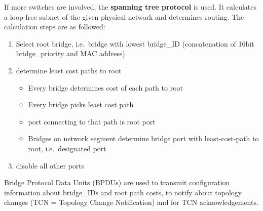 \vspace{10pt}
If more switches are involved, the \textbf{spanning tree protocol} is used.
It calculates a loop-free subnet of the given physical network and determines routing.
The calculation steps are as followed:
\begin{enumerate}
  \item Select root bridge, i.e.\ bridge with lowest bridge\_ID (concatenation of 16bit bridge\_priority and MAC address)
  \item determine least cost paths to root
  \begin{itemize}
    \item Every bridge determines cost of each path to root
    \item Every bridge picks least cost path
    \item port connecting to that path is root port 
    \item Bridges on network segment determine bridge port with least-cost-path to root, i.e.\ designated port
  \end{itemize}
  \item disable all other ports
\end{enumerate}

Bridge Protocol Data Units (BPDUs) are used to transmit configuration information about bridge\_IDs and root path costs, to notify about topology changes (TCN = Topology Change Notification) and for TCN acknowledgements.
